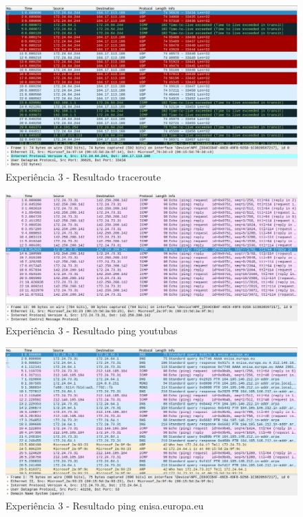 \begin{figure}[H]
\centering
  \includegraphics[width=\linewidth]{img/EXP3-traceroute.png}
  \caption{Experiência 3 - Resultado traceroute}
\end{figure}

\begin{figure}[H]
\centering
  \includegraphics[width=\linewidth]{img/EXP3-youtubas.png}
  \caption{Experiência 3 - Resultado ping youtubas}
\end{figure}

\begin{figure}[H]
\centering
  \includegraphics[width=\linewidth]{img/EXP3-enisa.png}
  \caption{Experiência 3 - Resultado ping enisa.europa.eu}
\end{figure}



